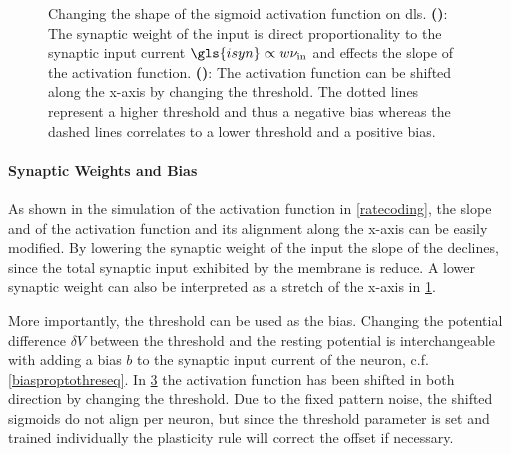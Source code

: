 \begin{figure}[tb!]
	\begin{subfigure}[c]{0.5\textwidth}
		\centering
		\caption{}
		
		\label{dlsactivationfunctionweight}
	\end{subfigure}	
	\begin{subfigure}[c]{0.5\textwidth}
		\centering
		\caption{}
		
		\label{dlsactivationfunctionbias}
	\end{subfigure}
	\caption[Changing the shape of the sigmoid activation function on \gls{dls}.]{Changing the shape of the sigmoid activation function on \gls{dls}. \textbf{()}: The synaptic weight of the input is direct proportionality to the synaptic input current $\gls{isyn} \propto w \nu_\text{in}$ and effects the slope of the activation function. \textbf{()}: The activation function can be shifted along the x-axis by changing the threshold. The dotted lines represent a higher threshold and thus a negative bias whereas the dashed lines correlates to a lower threshold and a positive bias.}
\end{figure}

\paragraph{Synaptic Weights and Bias} As shown in the simulation of the activation function in \cref{ratecoding}, the slope and of the activation function and its alignment along the x-axis can be easily modified. By lowering the synaptic weight of the input the slope of the declines, since the total synaptic input exhibited by the membrane is reduce. A lower synaptic weight can also be interpreted as a stretch of the x-axis in \cref{dlsactivationfunctionweight}.

More importantly, the threshold can be used as the bias. Changing the potential difference $\delta V$ between the threshold and the resting potential is interchangeable with adding a bias $b$ to the synaptic input current of the neuron, c.f. \cref{biasproptothreseq}. In \cref{dlsactivationfunctionbias} the activation function has been shifted in both direction by changing the threshold. Due to the fixed pattern noise, the shifted sigmoids do not align per neuron, but since the threshold parameter is set and trained individually the plasticity rule will correct the offset if necessary.



